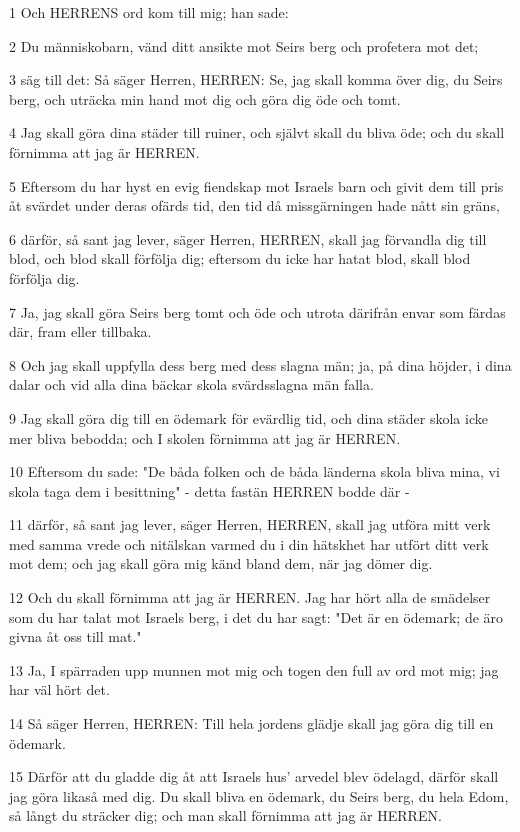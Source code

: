 \par 1 Och HERRENS ord kom till mig; han sade:
\par 2 Du människobarn, vänd ditt ansikte mot Seirs berg och profetera mot det;
\par 3 säg till det: Så säger Herren, HERREN: Se, jag skall komma över dig, du Seirs berg, och uträcka min hand mot dig och göra dig öde och tomt.
\par 4 Jag skall göra dina städer till ruiner, och självt skall du bliva öde; och du skall förnimma att jag är HERREN.
\par 5 Eftersom du har hyst en evig fiendskap mot Israels barn och givit dem till pris åt svärdet under deras ofärds tid, den tid då missgärningen hade nått sin gräns,
\par 6 därför, så sant jag lever, säger Herren, HERREN, skall jag förvandla dig till blod, och blod skall förfölja dig; eftersom du icke har hatat blod, skall blod förfölja dig.
\par 7 Ja, jag skall göra Seirs berg tomt och öde och utrota därifrån envar som färdas där, fram eller tillbaka.
\par 8 Och jag skall uppfylla dess berg med dess slagna män; ja, på dina höjder, i dina dalar och vid alla dina bäckar skola svärdsslagna män falla.
\par 9 Jag skall göra dig till en ödemark för evärdlig tid, och dina städer skola icke mer bliva bebodda; och I skolen förnimma att jag är HERREN.
\par 10 Eftersom du sade: "De båda folken och de båda länderna skola bliva mina, vi skola taga dem i besittning" - detta fastän HERREN bodde där -
\par 11 därför, så sant jag lever, säger Herren, HERREN, skall jag utföra mitt verk med samma vrede och nitälskan varmed du i din hätskhet har utfört ditt verk mot dem; och jag skall göra mig känd bland dem, när jag dömer dig.
\par 12 Och du skall förnimma att jag är HERREN. Jag har hört alla de smädelser som du har talat mot Israels berg, i det du har sagt: "Det är en ödemark; de äro givna åt oss till mat."
\par 13 Ja, I spärraden upp munnen mot mig och togen den full av ord mot mig; jag har väl hört det.
\par 14 Så säger Herren, HERREN: Till hela jordens glädje skall jag göra dig till en ödemark.
\par 15 Därför att du gladde dig åt att Israels hus' arvedel blev ödelagd, därför skall jag göra likaså med dig. Du skall bliva en ödemark, du Seirs berg, du hela Edom, så långt du sträcker dig; och man skall förnimma att jag är HERREN.

